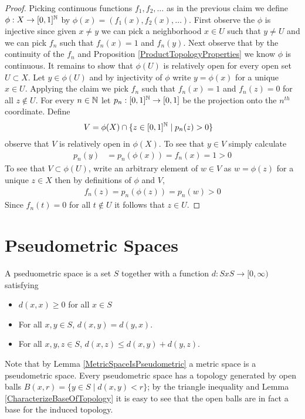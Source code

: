 \begin{proof}
Picking continuous functions $f_1, f_2, \dotsc$ as in the previous claim we define $\phi : X \to [0,1]^{\mathbb{N}}$ by $\phi(x) = (f_1(x), f_2(x), \dotsc)$.  First observe the $\phi$ is injective since given $x \neq y$ we can pick a neighborhood $x \in U$ such that $y \neq U$ and we can pick $f_n$ such that $f_n(x) = 1$ and $f_n(y)$.  Next observe that by the continuity of the $f_n$ and Proposition \ref{ProductTopologyProperties} we know $\phi$ is continuous.  It remains to show that $\phi(U)$ is relatively open for every open set $U \subset X$.  Let $y \in \phi(U)$ and by injectivity of $\phi$ write $y = \phi(x)$ for a unique $x \in U$.  Applying the claim we pick $f_n$ such that $f_n(x) = 1$ and $f_n(z)=0$ for all $z \notin U$.  For every $n \in \mathbb{N}$ let $p_n : [0,1]^{\mathbb{N}}  \to [0,1]$ be the projection onto the $n^{th}$ coordinate.  Define
\begin{align*}
V &= \phi(X) \cap \lbrace z \in [0,1]^{\mathbb{N}} \mid  p_n(z) > 0 \rbrace
\end{align*}
observe that $V$ is relatively open in $\phi(X)$. To see that $y \in V$ simply calculate
\begin{align*}
p_n(y) &= p_n(\phi(x)) = f_n(x) = 1 > 0
\end{align*}
To see that $V \subset \phi(U)$, write an arbitrary element of $w \in V$ as $w = \phi(z)$ for a unique $z \in X$ then by definitions of $\phi$ and $V$, 
\begin{align*}
f_n(z) = p_n(\phi(z)) = p_n(w) > 0
\end{align*}
Since $f_n(t)=0$ for all $t \notin U$ it follows that $z \in U$.
\end{proof}

\section{Pseudometric Spaces}

\begin{defn}A pseduometric space is a set $S$ together with a function
  $d:SxS \to [0,\infty)$ satisfying
\begin{itemize}
\item[(i)]$d(x,x) \geq 0$ for all $x \in S$
\item[(ii)]For all $x,y \in S$, $d(x,y) = d(y,x)$.
\item[(iii)]For all $x,y,z \in S$, $d(x,z) \leq d(x,y) + d(y,z)$.
\end{itemize}
\end{defn}

Note that by Lemma \ref{MetricSpaceIsPseudometric} a metric space is a
pseudometric space.  Every pseudometric space has a topology generated
by open balls $B(x,r) = \lbrace y \in S \mid d(x,y) < r \rbrace$; by the triangle inequality
and Lemma \ref{CharacterizeBaseOfTopology} it is easy to see that the open balls are in fact
a base for the induced topology.

